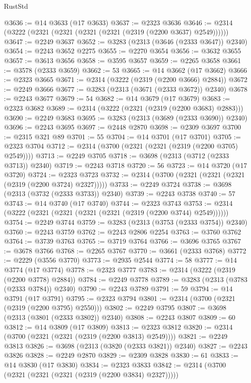 \begin{lexlean}{RustStd}
\begin{coremodule}
@3636 := @14 @3633 (@17 @3633)
@3637 := @2323 @3636
@3646 := @2314 (@3222 (@2321 (@2321 (@2321 (@2321 (@2319 (@2200 @3637) @2549))))))
@3647 := @2249 @3637
@3652 := @3283 (@2313 (@3646 (@2333 @3647)) @2340)
@3654 := @2243 @3652 @2275
@3655 := @2270 @3654
@3656 := @3632 @3655
@3657 := @3613 @3656
@3658 := @3595 @3657
@3659 := @2265 @3658
@3661 := @3578 (@2333 @3659)
@3662 := 53
@3665 := @14 @3662 (@17 @3662)
@3666 := @2323 @3665
@3671 := @2314 (@3222 (@2319 (@2200 @3666) @2884))
@3672 := @2249 @3666
@3677 := @3283 (@2313 (@3671 (@2333 @3672)) @2340)
@3678 := @2243 @3677
@3679 := 54
@3682 := @14 @3679 (@17 @3679)
@3683 := @2323 @3682
@3689 := @2314 (@3222 (@2321 (@2319 (@2200 @3683) @2883)))
@3690 := @2249 @3683
@3695 := @3283 (@2313 (@3689 (@2333 @3690)) @2340)
@3696 := @2243 @3695
@3697 := @2448 @2870
@3698 := @2309 @3697
@3700 := @2315 @321 @89
@3701 := 55
@3704 := @14 @3701 (@17 @3701)
@3705 := @2323 @3704
@3712 := @2314 (@3700 (@2321 (@2321 (@2319 (@2200 @3705) @2549))))
@3713 := @2249 @3705
@3718 := @3698 (@2313 (@3712 (@2333 @3713)) @2340)
@3719 := @2243 @3718
@3720 := 56
@3723 := @14 @3720 (@17 @3720)
@3724 := @2323 @3723
@3732 := @2314 (@3700 (@2321 (@2321 (@2321 (@2319 (@2200 @3724) @2327)))))
@3733 := @2249 @3724
@3738 := @3698 (@2313 (@3732 (@2333 @3733)) @2340)
@3739 := @2243 @3738
@3740 := 57
@3743 := @14 @3740 (@17 @3740)
@3744 := @2323 @3743
@3753 := @2314 (@3222 (@2321 (@2321 (@2321 (@2321 (@2319 (@2200 @3744) @2549))))))
@3754 := @2249 @3744
@3759 := @3283 (@2313 (@3753 (@2333 @3754)) @2340)
@3760 := @2243 @3759
@3762 := @2243 @2806 @2254
@3763 := @3760 @3762
@3764 := @3739 @3763
@3765 := @3719 @3764
@3766 := @3696 @3765
@3767 := @3678 @3766
@3768 := @2265 @3767
@3770 := @3661 (@2333 @3768)
@3772 := @2229 (@3556 @3770)
@3773 := @2935 @2544
@3774 := 58
@3777 := @14 @3774 (@17 @3774)
@3778 := @2323 @3777
@3783 := @2314 (@3222 (@2319 (@2200 @3778) @2884))
@3784 := @2249 @3778
@3789 := @3283 (@2313 (@3783 (@2333 @3784)) @2340)
@3790 := @2243 @3789
@3791 := 59
@3794 := @14 @3791 (@17 @3791)
@3795 := @2323 @3794
@3801 := @2314 (@3700 (@2321 (@2319 (@2200 @3795) @2550)))
@3802 := @2249 @3795
@3807 := @3698 (@2313 (@3801 (@2333 @3802)) @2340)
@3808 := @2243 @3807
@3809 := 60
@3812 := @14 @3809 (@17 @3809)
@3813 := @2323 @3812
@3820 := @2314 (@3700 (@2321 (@2321 (@2319 (@2200 @3813) @2549))))
@3821 := @2249 @3813
@3826 := @3698 (@2313 (@3820 (@2333 @3821)) @2340)
@3827 := @2243 @3826
@3828 := @2249 @2870
@3829 := @2309 @3828
@3830 := 61
@3833 := @14 @3830 (@17 @3830)
@3834 := @2323 @3833
@3842 := @2314 (@3700 (@2321 (@2321 (@2321 (@2319 (@2200 @3834) @2327)))))

\end{coremodule}
\end{lexlean}
